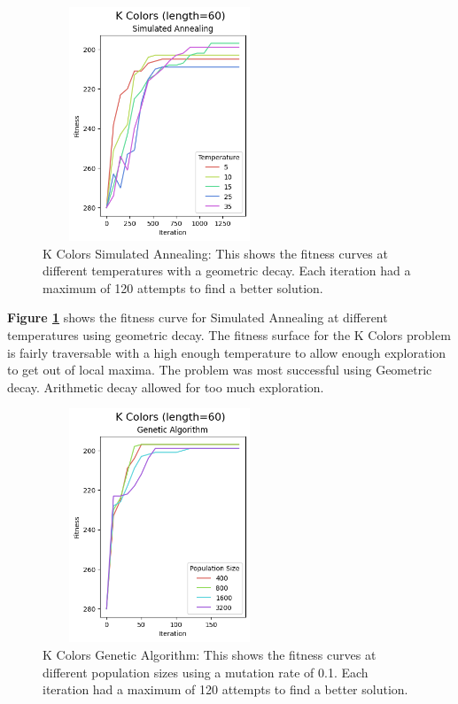 \documentclass[letterpaper]{article} %
\begin{document}
\begin{figure}[!htb]
\centering
\includegraphics[width=2.75in, height=2.75in]{figures/K_Colors_length=60_Simulated_Annealing_l_60_ma_300_d_geom_t_5__10__15__25__35_.png}
\caption{K Colors Simulated Annealing: This shows the fitness curves at different temperatures with a geometric decay. Each iteration had a maximum of 120 attempts to find a better solution. }
\label{fig:kcolor_sa}
\end{figure}

\textbf{Figure \ref{fig:kcolor_sa}} shows the fitness curve for Simulated Annealing at different temperatures using geometric decay.  The fitness surface for the K Colors problem is fairly traversable with a high enough temperature to allow enough exploration to get out of local maxima. The problem was most successful using Geometric decay.  Arithmetic decay allowed for too much exploration.


\begin{figure}[!htb]
\centering
\includegraphics[width=2.75in, height=2.75in]{figures/K_Colors_length=60_Genetic_Algorithm_l_60_ma_120_p_400__800__1600__3200_mu_0.1_.png}
\caption{K Colors Genetic Algorithm: This shows the fitness curves at different population sizes using a mutation rate of 0.1. Each iteration had a maximum of 120 attempts to find a better solution. }
\label{fig:kcolor_ga}
\end{figure}
\end{document}
